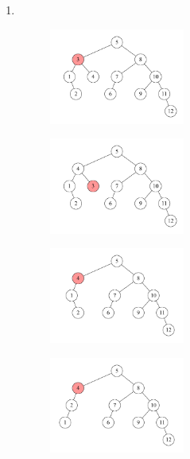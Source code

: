\documentclass[11pt,a4paper]{article}
\begin{document}
\begin{loesung}
    \begin{enumerate}
        \item \ \\
        \begin{figure}[h!]
            \centering
            \includegraphics[width=0.42\textwidth]{img/avl.png}
        \end{figure}
        \FloatBarrier   
        \begin{figure}[h!]
            \centering
            \includegraphics[width=0.42\textwidth]{img/avl2.png}
        \end{figure}
        \FloatBarrier
        \begin{figure}[h!]
            \centering
            \includegraphics[width=0.42\textwidth]{img/avl3.png}
        \end{figure}
        \FloatBarrier
        \begin{figure}[h!]
            \centering
            \includegraphics[width=0.42\textwidth]{img/avl4.png}

\end{figure}
\end{enumerate}
\end{loesung}
\end{document}
